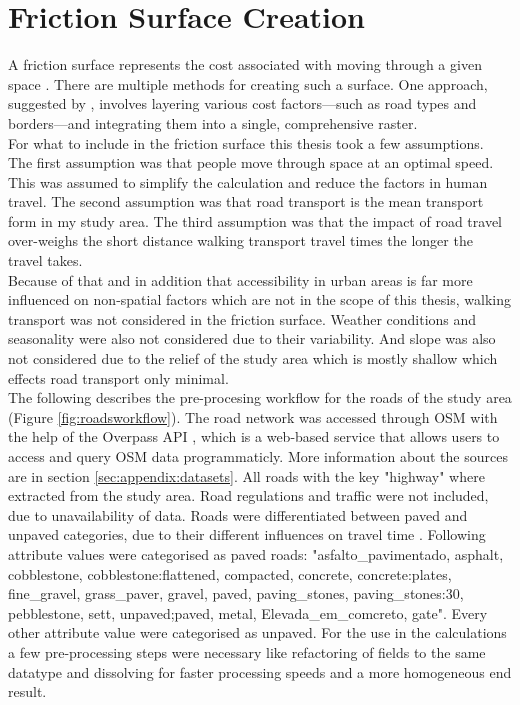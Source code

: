 \documentclass[11pt, a4paper]{report}
\begin{document}
\section{Friction Surface Creation}\label{sec:method:frictionsurface}
A friction surface represents the cost associated with moving through a given space \citet{carrothers_historical_1956}. There are multiple methods for creating such a surface. One approach, suggested by \citet{weiss_global_2020}, involves layering various cost factors—such as road types and borders—and integrating them into a single, comprehensive raster. \\
%
For what to include in the friction surface this thesis took a few assumptions. The first assumption was that people  move through space at an optimal speed. This was assumed to simplify the calculation and reduce the factors in human travel. The second assumption was that road transport is the mean transport form in my study area. The third assumption was that the impact of road travel over-weighs the short distance walking transport travel times the longer the travel takes. \\
%
Because of that and in addition that accessibility in urban areas is far more influenced on non-spatial factors which are not in the scope of this thesis, walking transport was not considered in the friction surface. Weather conditions and seasonality were also not considered due to their variability. And slope was also not considered due to the relief of the study area which is mostly shallow which effects road transport only minimal. \\
%
The following describes the pre-procesing workflow for the roads of the study area (Figure \ref{fig:roadsworkflow}). The road network was accessed through OSM with the help of the Overpass  API \citet{olbricht_drolbroverpass-api_2024}, which is a web-based service that allows users to access and query OSM data programmaticly. More information about the sources are in section \ref{sec:appendix:datasets}. All roads with the key "highway" where extracted from the study area. Road regulations and traffic were not included, due to unavailability of data. Roads were differentiated between paved and unpaved categories, due to their different influences on travel time \citet{weiss_global_2018}. Following attribute values were categorised as paved roads: "asfalto\_pavimentado, asphalt, cobblestone, cobblestone:flattened, compacted, concrete, concrete:plates, fine\_gravel, grass\_paver, gravel, paved, paving\_stones, paving\_stones:30, pebblestone, sett, unpaved;paved, metal, Elevada\_em\_comcreto, gate". Every other attribute value were categorised as unpaved. For the use in the calculations a few pre-processing steps were necessary like refactoring of fields to the same datatype and dissolving for faster processing speeds and a more homogeneous end result.
\end{document}
